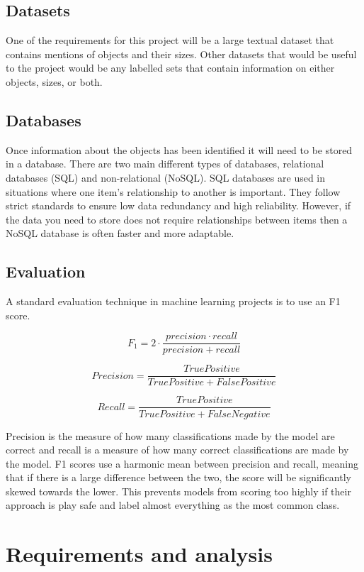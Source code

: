 \documentclass[11pt,oneside]{book}
\begin{document}
\section{Datasets}

One of the requirements for this project will be a large textual dataset that contains mentions of objects and their sizes. Other datasets that would be useful to the project would be any labelled sets that contain information on either objects, sizes, or both.

\section{Databases}

Once information about the objects has been identified it will need to be stored in a database. There are two main different types of databases, relational databases (SQL) and non-relational (NoSQL). SQL databases are used in situations where one item's relationship to another is important. They follow strict standards to ensure low data redundancy and high reliability. However, if the data you need to store does not require relationships between items then a NoSQL database is often faster and more adaptable. 

\section{Evaluation}
A standard evaluation technique in machine learning projects is to use an F1 score.

\[ F_1 = 2 \cdot \frac{precision \cdot recall}{precision + recall} \]

\[ Precision = \frac{True Positive}{True Positive + False Positive} \]

\[ Recall = \frac{True Positive}{True Positive + False Negative} \]

Precision is the measure of how many classifications made by the model are correct and recall is a measure of how many correct classifications are made by the model. F1 scores use a harmonic mean between precision and recall, meaning that if there is a large difference between the two, the score will be significantly skewed towards the lower. This prevents models from scoring too highly if their approach is play safe and label almost everything as the most common class.

\chapter{Requirements and analysis}
\end{document}

